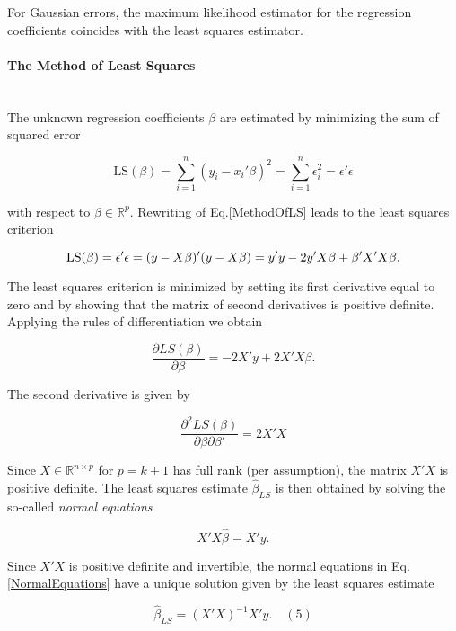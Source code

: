 \documentclass[10pt,a4paper]{article}
\newcommand{\subsubsubsection}[1]{\paragraph{#1}\mbox{}\\}
\begin{document}
	For Gaussian errors, the maximum likelihood estimator for the regression coefficients coincides with the least squares estimator. 
	
	\subsubsubsection{The Method of Least Squares}
	
	The unknown regression coefficients $\beta$ are estimated by minimizing the sum of squared error
	
	\begin{equation} \label{MethodOfLS}
	\text{LS}(\beta) = \sum_{i=1}^n(y_i - x_i'\beta)^2 = \sum_{i=1}^n\epsilon_i^2 = \epsilon'\epsilon
	\end{equation}
	
	with respect to $\beta \in \mathbb{R}^p$. Rewriting of Eq.\ref{MethodOfLS} leads to the least squares criterion
	
	\begin{equation*}
	\text{LS}(\beta) = \epsilon'\epsilon \\ = (y - X\beta)'(y - X\beta) \\ = y'y - 2y'X\beta + \beta'X'X\beta.
	\end{equation*}
	
	The least squares criterion is minimized by setting its first derivative equal to zero and by showing that the matrix of second derivatives is positive definite. Applying the rules of differentiation we obtain

	\begin{equation*}
	\frac{\partial LS(\beta)}{\partial \beta} = -2X' y + 2X'X\beta.
	\end{equation*}
	
	The second derivative is given by
	
	\begin{equation*}
	\frac{\partial^2LS(\beta)}{\partial\beta \partial \beta'} = 2X'X
	\end{equation*}
		
	Since $X \in \mathbb{R}^{n \times p}$ for $p = k + 1$ has full rank (per assumption), the matrix $X'X$ is positive definite. The least squares estimate $\hat \beta_{LS}$ is then obtained by solving the so-called \emph{normal equations}
	
	\begin{equation} \label{NormalEquations}
	X'X \hat \beta = X'y.
	\end{equation}
	
	
	Since $X'X$ is positive definite and invertible, the normal equations in Eq.\ref{NormalEquations} have a unique solution given by the least squares estimate
	
	\begin{equation*}
	\hat \beta_{LS} = (X'X)^{-1}X'y. \quad(5)
	\end{equation*}
	
	

\printbibliography
	
\end{document}
